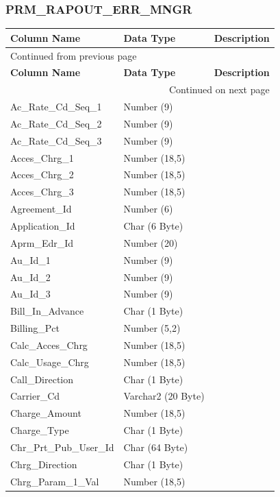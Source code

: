 \documentclass[12pt,twoside]{article}
\begin{document}
\normalsize
\subsubsection{PRM\_RAPOUT\_ERR\_MNGR}
\label{sec:orgheadline134}
\footnotesize

\begin{longtable}{l|l|l}
\hline
\textbf{Column Name} & \textbf{Data Type} & \textbf{Description}\\
\hline
\endfirsthead
\multicolumn{3}{l}{Continued from previous page} \\
\hline

\textbf{Column Name} & \textbf{Data Type} & \textbf{Description} \\

\hline
\endhead
\hline\multicolumn{3}{r}{Continued on next page} \\
\endfoot
\endlastfoot
\hline
Ac\_Rate\_Cd\_Seq\_1 & Number (9) & \\
Ac\_Rate\_Cd\_Seq\_2 & Number (9) & \\
Ac\_Rate\_Cd\_Seq\_3 & Number (9) & \\
Acces\_Chrg\_1 & Number (18,5) & \\
Acces\_Chrg\_2 & Number (18,5) & \\
Acces\_Chrg\_3 & Number (18,5) & \\
Agreement\_Id & Number (6) & \\
Application\_Id & Char (6 Byte) & \\
Aprm\_Edr\_Id & Number (20) & \\
Au\_Id\_1 & Number (9) & \\
Au\_Id\_2 & Number (9) & \\
Au\_Id\_3 & Number (9) & \\
Bill\_In\_Advance & Char (1 Byte) & \\
Billing\_Pct & Number (5,2) & \\
Calc\_Acces\_Chrg & Number (18,5) & \\
Calc\_Usage\_Chrg & Number (18,5) & \\
Call\_Direction & Char (1 Byte) & \\
Carrier\_Cd & Varchar2 (20 Byte) & \\
Charge\_Amount & Number (18,5) & \\
Charge\_Type & Char (1 Byte) & \\
Chr\_Prt\_Pub\_User\_Id & Char (64 Byte) & \\
Chrg\_Direction & Char (1 Byte) & \\
Chrg\_Param\_1\_Val & Number (18,5) & \\

\end{longtable}
\end{document}
